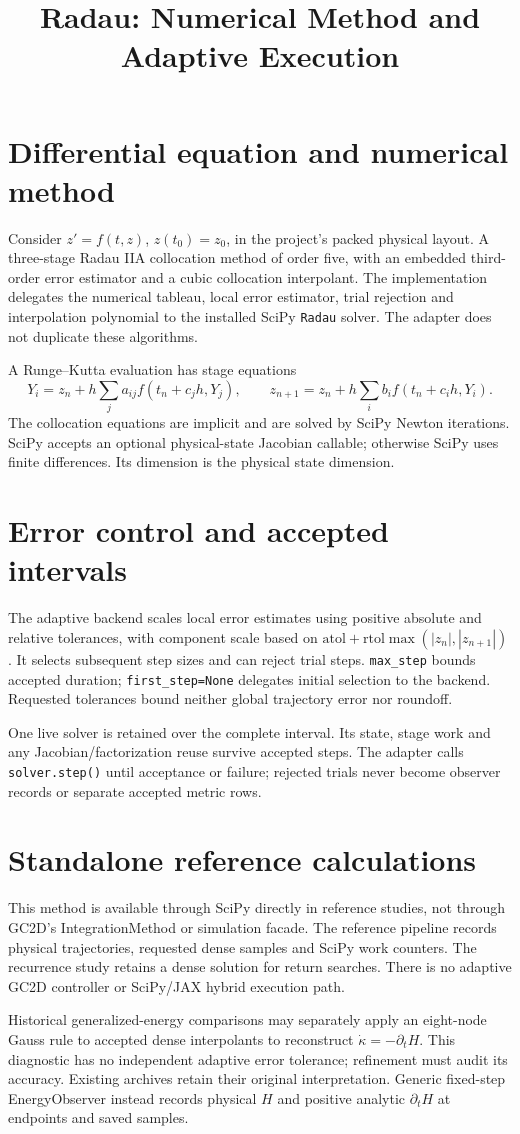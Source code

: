 \documentclass[11pt,a4paper]{article}
\title{Radau: Numerical Method and Adaptive Execution}
\author{}\date{}\setlength{\emergencystretch}{3em}
\begin{document}
\maketitle
\section{Differential equation and numerical method}
Consider $z'=f(t,z)$, $z(t_0)=z_0$, in the project's packed physical layout.
A three-stage Radau IIA collocation method of order five, with an embedded third-order error estimator and a cubic collocation interpolant. The implementation delegates the numerical tableau, local error
estimator, trial rejection and interpolation polynomial to the installed SciPy
\texttt{Radau} solver. The adapter does not duplicate these algorithms.

A Runge--Kutta evaluation has stage equations
\[
Y_i=z_n+h\sum_j a_{ij}f(t_n+c_jh,Y_j),\qquad
z_{n+1}=z_n+h\sum_i b_i f(t_n+c_ih,Y_i).
\]
The collocation equations are implicit and are solved by SciPy Newton iterations. SciPy accepts an optional physical-state Jacobian callable; otherwise SciPy uses finite differences. Its dimension is the physical state dimension.
\section{Error control and accepted intervals}
The adaptive backend scales local error estimates using positive absolute and
relative tolerances, with component scale based on
$\mathrm{atol}+\mathrm{rtol}\max(|z_n|,|z_{n+1}|)$. It selects subsequent step
sizes and can reject trial steps. \texttt{max\_step} bounds accepted duration;
\texttt{first\_step=None} delegates initial selection to the backend.
Requested tolerances bound neither global trajectory error nor roundoff.

One live solver is retained over the complete interval. Its state, stage work
and any Jacobian/factorization reuse survive accepted steps. The adapter calls
\texttt{solver.step()} until acceptance or failure; rejected trials never
become observer records or separate accepted metric rows.
\section{Standalone reference calculations}
This method is available through SciPy directly in reference studies, not through
GC2D's IntegrationMethod or simulation facade. The reference pipeline records
physical trajectories, requested dense samples and SciPy work counters.
The recurrence study retains a dense solution for return searches.
There is no adaptive GC2D controller or SciPy/JAX hybrid execution path.

Historical generalized-energy comparisons may separately apply an eight-node
Gauss rule to accepted dense interpolants to reconstruct
$\dot\kappa=-\partial_tH$. This diagnostic has no independent adaptive error
tolerance; refinement must audit its accuracy. Existing archives retain their
original interpretation. Generic fixed-step EnergyObserver instead records
physical $H$ and positive analytic $\partial_tH$ at endpoints and saved samples.
\end{document}

